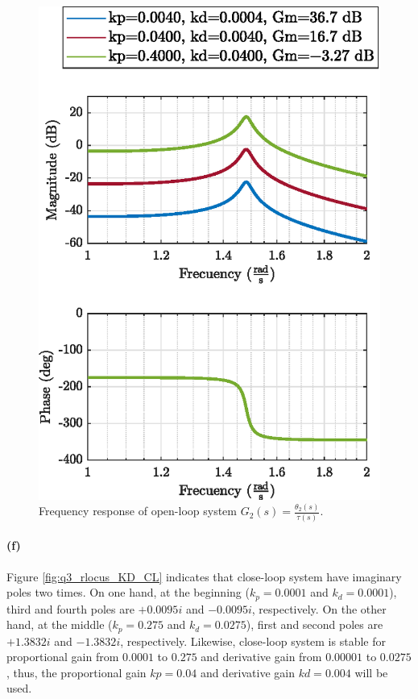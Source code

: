 \begin{figure}[h!]
	\centering
	\includegraphics{images/question3/q3_bode_KD_OL.eps}
	\caption{Frequency response of open-loop system $G_2(s)=\frac{\theta_2(s)}{\tau(s)}$.}
	\label{fig:q3_bode_KD_OL}
\end{figure}

\newpage
\paragraph{(f)}  Figure \ref{fig:q3_rlocus_KD_CL} indicates that close-loop system have imaginary poles two times. On one hand, at the beginning ($k_p=0.0001$ and $k_d=0.0001$), third and fourth poles are $+0.0095i$ and $-0.0095i$, respectively. On the other hand, at the middle  ($k_p=0.275$ and $k_d=0.0275$), first and second poles are $+1.3832i$ and $-1.3832i$, respectively. Likewise,  close-loop system is stable for proportional gain from $0.0001$ to $0.275$ and derivative gain from $0.00001$ to $0.0275$, thus, the proportional gain $kp=0.04$ and derivative gain $kd=0.004$ will be used. 

